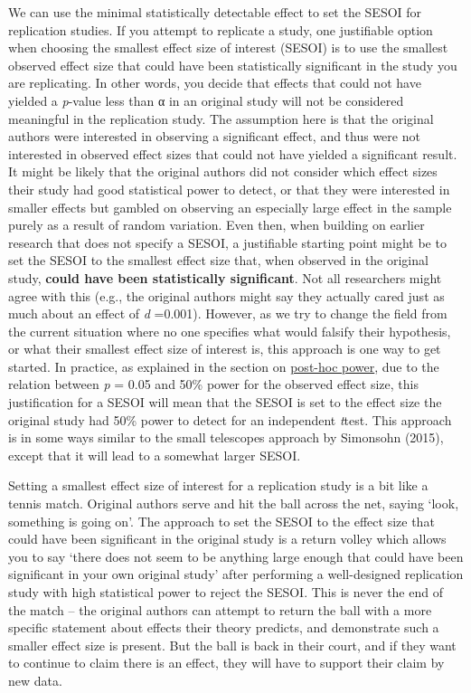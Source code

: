 \documentclass[
  oneside]{book}
\begin{document}
We can use the minimal statistically detectable effect to set the SESOI for replication studies. If you attempt to replicate a study, one justifiable option when choosing the smallest effect size of interest (SESOI) is to use the smallest observed effect size that could have been statistically significant in the study you are replicating. In other words, you decide that effects that could not have yielded a \emph{p}-value less than α in an original study will not be considered meaningful in the replication study. The assumption here is that the original authors were interested in observing a significant effect, and thus were not interested in observed effect sizes that could not have yielded a significant result. It might be likely that the original authors did not consider which effect sizes their study had good statistical power to detect, or that they were interested in smaller effects but gambled on observing an especially large effect in the sample purely as a result of random variation. Even then, when building on earlier research that does not specify a SESOI, a justifiable starting point might be to set the SESOI to the smallest effect size that, when observed in the original study, \textbf{could have been statistically significant}. Not all researchers might agree with this (e.g., the original authors might say they actually cared just as much about an effect of \emph{d} =0.001). However, as we try to change the field from the current situation where no one specifies what would falsify their hypothesis, or what their smallest effect size of interest is, this approach is one way to get started. In practice, as explained in the section on \protect\hyperlink{posthoc}{post-hoc power}, due to the relation between \emph{p} = 0.05 and 50\% power for the observed effect size, this justification for a SESOI will mean that the SESOI is set to the effect size the original study had 50\% power to detect for an independent \emph{t}test. This approach is in some ways similar to the small telescopes approach by Simonsohn (2015), except that it will lead to a somewhat larger SESOI.

Setting a smallest effect size of interest for a replication study is a bit like a tennis match. Original authors serve and hit the ball across the net, saying `look, something is going on'. The approach to set the SESOI to the effect size that could have been significant in the original study is a return volley which allows you to say `there does not seem to be anything large enough that could have been significant in your own original study' after performing a well-designed replication study with high statistical power to reject the SESOI. This is never the end of the match -- the original authors can attempt to return the ball with a more specific statement about effects their theory predicts, and demonstrate such a smaller effect size is present. But the ball is back in their court, and if they want to continue to claim there is an effect, they will have to support their claim by new data.
\end{document}

